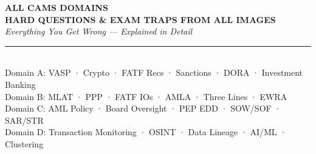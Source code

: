 \documentclass[12pt,aspectratio=169]{beamer}
\begin{document}
	
	\begin{frame}
		\centering
		\vspace{0.5cm}
		{\fontsize{18}{22}\selectfont \textbf{ALL CAMS DOMAINS}}\\[0.15cm]
		{\fontsize{14}{17}\selectfont \textbf{HARD QUESTIONS \& EXAM TRAPS FROM ALL IMAGES}}\\[0.2cm]
		{\fontsize{9}{11}\selectfont \textit{Everything You Get Wrong — Explained in Detail}}\\[0.1cm]
		\rule{4cm}{0.5pt}\\[0.1cm]
		{\fontsize{7}{9}\selectfont Domain A: VASP · Crypto · FATF Recs · Sanctions · DORA · Investment Banking}\\[0.05cm]
		{\fontsize{7}{9}\selectfont Domain B: MLAT · PPP · FATF IOs · AMLA · Three Lines · EWRA}\\[0.05cm]
		{\fontsize{7}{9}\selectfont Domain C: AML Policy · Board Oversight · PEP EDD · SOW/SOF · SAR/STR}\\[0.05cm]
		{\fontsize{7}{9}\selectfont Domain D: Transaction Monitoring · OSINT · Data Lineage · AI/ML · Clustering}
		\vspace{0.3cm}
	\end{frame}
	
\end{document}
